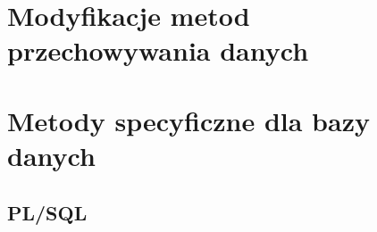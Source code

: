\documentclass[12pt,a4paper,oneside]{report}
\begin{document}


\chapter{Modyfikacje metod przechowywania danych}


\chapter{Metody specyficzne dla bazy danych}
	\section{PL/SQL}
	\clearpage

	
	\clearpage

	
	\clearpage

	
	\clearpage
	
	
	\clearpage



\end{document}
